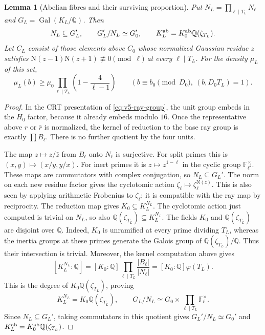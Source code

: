 \documentclass[11pt]{article}
\newtheorem{lemma}[theorem]{Lemma}
\theoremstyle{definition}
\theoremstyle{remark}
\begin{document}
\begin{lemma}[Abelian fibres and their surviving proportion]
\label{lem:v5-ray-fibres}
Put $N_L=\prod_{\ell\mid T_L}N_\ell$ and
$G_L=\operatorname{Gal}(K_L/\mathbb Q)$.
Then
\[
 N_L\subseteq G_L',\qquad
 G_L'/N_L\simeq G_0',\qquad
 K_L^{\rm ab}=K_0^{\rm ab}\mathbb Q(\zeta_{T_L}).
\]
Let $C_L$ consist of those elements above $C_0$ whose normalized Gaussian
residue $z$ satisfies $\mathrm N(z-1)\mathrm N(z+1)\not\equiv0\pmod\ell$
at every $\ell\mid T_L$. For the density $\mu_L$ of this set,
\begin{equation}\label{eq:v5-ray-density}
 \mu_L(b)\geq\mu_0
       \prod_{\ell\mid T_L}\left(1-\frac4{\ell-1}\right)
 \qquad (b\equiv b_0\pmod{D_0},\ (b,D_0T_L)=1).
\end{equation}
\end{lemma}
\begin{proof}
In the CRT presentation of \eqref{eq:v5-ray-group}, the unit group
embeds in the $H_0$ factor, because it already embeds modulo $16$.
Once the representative above $r$ or $\bar r$ is normalized, the kernel
of reduction to the base ray group is exactly $\prod B_\ell$.
There is no further quotient by the four units.

The map $z\mapsto z/\bar z$ from $B_\ell$ onto $N_\ell$ is surjective.
For split primes this is $(x,y)\mapsto(x/y,y/x)$.
For inert primes it is $z\mapsto z^{1-\ell}$ in the cyclic group
$\mathbb F_{\ell^2}^\times$.
These maps are commutators with complex conjugation, so $N_L\subseteq G_L'$.
The norm on each new residue factor gives the cyclotomic action
$\zeta_\ell\mapsto\zeta_\ell^{\mathrm N(z)}$.
This is also seen by applying arithmetic Frobenius to $\zeta_\ell$;
it is compatible with the ray map by reciprocity.
The reduction map gives $K_0\subseteq K_L^{N_L}$. The cyclotomic
action just computed is trivial on $N_L$, so also
$\mathbb Q(\zeta_{T_L})\subseteq K_L^{N_L}$.
The fields $K_0$ and $\mathbb Q(\zeta_{T_L})$ are disjoint over
$\mathbb Q$. Indeed, $K_0$ is unramified at every prime dividing
$T_L$, whereas the inertia groups at these primes generate the
Galois group of $\mathbb Q(\zeta_{T_L})/\mathbb Q$. Thus their
intersection is trivial. Moreover, the kernel computation above gives
\[
 [K_L^{N_L}:\mathbb Q]
 =[K_0:\mathbb Q]\prod_{\ell\mid T_L}\frac{|B_\ell|}{|N_\ell|}
 =[K_0:\mathbb Q]\varphi(T_L).
\]
This is the degree of $K_0\mathbb Q(\zeta_{T_L})$, proving
\[
 K_L^{N_L}=K_0\mathbb Q(\zeta_{T_L}),\qquad
 G_L/N_L\simeq G_0\times\prod_{\ell\mid T_L}\mathbb F_\ell^\times.
\]
Since $N_L\subseteq G_L'$, taking commutators in this quotient gives
$G_L'/N_L\simeq G_0'$ and
$K_L^{\rm ab}=K_0^{\rm ab}\mathbb Q(\zeta_{T_L})$.


\end{proof}
\end{document}
